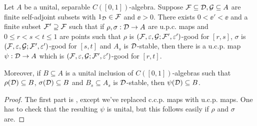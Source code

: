 \documentclass[12pt]{amsart}
\begin{document}
\begin{lemma}\label{lem:exist-F-ee}
Let $A$ be a unital, separable $C([0,1])$-algebra. Suppose $\mathcal{F} \subseteq \mathcal{D}, \mathcal{G} \subseteq A$ are finite self-adjoint subsets with $1_{\mathcal{D}} \in \mathcal{F}$ and $\ee > 0$. There exists $0 < \ee' < \ee$ and a finite subset $\mathcal{F}' \supseteq \mathcal{F}$ such that if $\rho,\sigma: \mathcal{D} \to A$ are u.p.c. maps and $0 \leq r < s < t \leq 1$ are points such that $\rho$ is $(\mathcal{F},\varepsilon,\mathcal{G};\mathcal{F}',\varepsilon')$-good for $[r,s]$,  $\sigma$ is $(\mathcal{F},\varepsilon,\mathcal{G};\mathcal{F}',\varepsilon')$-good for $[s,t]$ and $A_s$ is $\mathcal{D}$-stable, then there is a u.c.p. map $\psi: \mathcal{D} \to A$ which is $(\mathcal{F},\varepsilon,\mathcal{G};\mathcal{F}',\varepsilon')$-good for $[r,t]$. 

Moreover, if $B \subseteq A$ is a unital inclusion of $C([0,1])$-algebras such that $\rho(\mathcal{D}) \subseteq B$, $\sigma(\mathcal{D}) \subseteq B$ and $B_s \subseteq A_s$ is $\mathcal{D}$-stable, then $\psi(\mathcal{D}) \subseteq B$.
\begin{proof}
The first part is \cite[Lemma 4.5]{HirshbergRordamWinter07}, except we've replaced c.c.p. maps with u.c.p. maps. One has to check that the resulting $\psi$ is unital, but this follows easily if $\rho$ and $\sigma$ are.


\end{proof}
\end{lemma}
\end{document}
